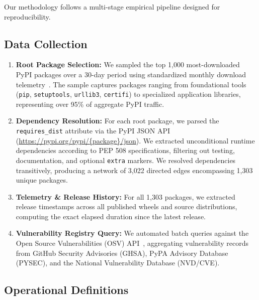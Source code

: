 \documentclass[conference]{IEEEtran}
\begin{document}
Our methodology follows a multi-stage empirical pipeline designed for reproducibility.

\subsection{Data Collection}

\begin{enumerate}
    \item \textbf{Root Package Selection:} We sampled the top 1,000 most-downloaded PyPI packages over a 30-day period using standardized monthly download telemetry~\cite{hugovk2024toppypi}. The sample captures packages ranging from foundational tools (\texttt{pip}, \texttt{setuptools}, \texttt{urllib3}, \texttt{certifi}) to specialized application libraries, representing over 95\% of aggregate PyPI traffic.
    \item \textbf{Dependency Resolution:} For each root package, we parsed the \texttt{requires\_dist} attribute via the PyPI JSON API (\url{https://pypi.org/pypi/{package}/json}). We extracted unconditional runtime dependencies according to PEP 508 specifications, filtering out testing, documentation, and optional \texttt{extra} markers. We resolved dependencies transitively, producing a network of 3,022 directed edges encompassing 1,303 unique packages.
    \item \textbf{Telemetry \& Release History:} For all 1,303 packages, we extracted release timestamps across all published wheels and source distributions, computing the exact elapsed duration since the latest release.
    \item \textbf{Vulnerability Registry Query:} We automated batch queries against the Open Source Vulnerabilities (OSV) API~\cite{osv2024database}, aggregating vulnerability records from GitHub Security Advisories (GHSA), PyPA Advisory Database (PYSEC), and the National Vulnerability Database (NVD/CVE).
\end{enumerate}

\subsection{Operational Definitions}
\end{document}
